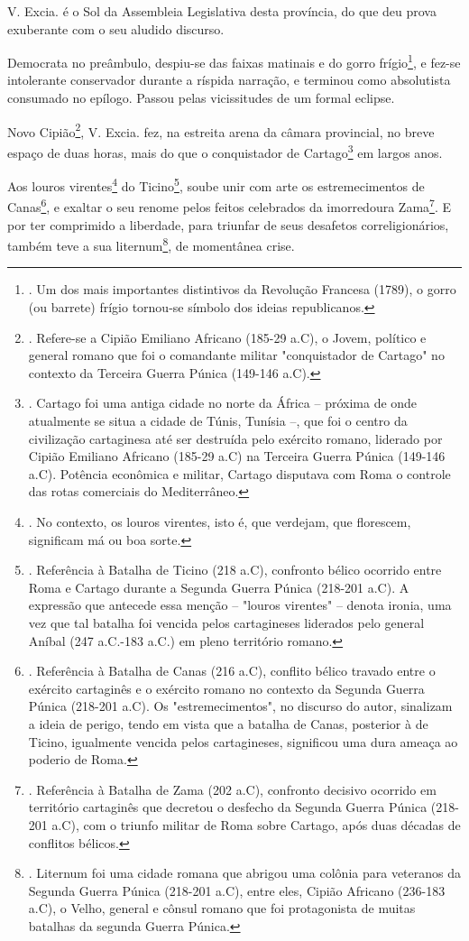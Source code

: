 V. Excia. é o Sol da Assembleia Legislativa desta província, do que deu
prova exuberante com o seu aludido discurso.

Democrata no preâmbulo, despiu-se das faixas matinais e do gorro
frígio\footnote{. Um dos mais importantes distintivos da Revolução
  Francesa (1789), o gorro (ou barrete) frígio tornou-se símbolo dos
  ideias republicanos.}, e fez-se intolerante conservador durante a
ríspida narração, e terminou como absolutista consumado no epílogo.
Passou pelas vicissitudes de um formal eclipse.

Novo Cipião\footnote{. Refere-se a Cipião Emiliano Africano (185-29
  a.C), o Jovem, político e general romano que foi o comandante militar
  "conquistador de Cartago" no contexto da Terceira Guerra Púnica
  (149-146 a.C).}, V. Excia. fez, na estreita arena da câmara
provincial, no breve espaço de duas horas, mais do que o conquistador de
Cartago\footnote{. Cartago foi uma antiga cidade no norte da África --
  próxima de onde atualmente se situa a cidade de Túnis, Tunísia --, que
  foi o centro da civilização cartaginesa até ser destruída pelo
  exército romano, liderado por Cipião Emiliano Africano (185-29 a.C) na
  Terceira Guerra Púnica (149-146 a.C). Potência econômica e militar,
  Cartago disputava com Roma o controle das rotas comerciais do
  Mediterrâneo.} em largos anos.

Aos louros virentes\footnote{. No contexto, os louros virentes, isto é,
  que verdejam, que florescem, significam má ou boa sorte.} do
Ticino\footnote{. Referência à Batalha de Ticino (218 a.C), confronto
  bélico ocorrido entre Roma e Cartago durante a Segunda Guerra Púnica
  (218-201 a.C). A expressão que antecede essa menção -- "louros
  virentes" -- denota ironia, uma vez que tal batalha foi vencida pelos
  cartagineses liderados pelo general Aníbal (247 a.C.-183 a.C.) em
  pleno território romano.}, soube unir com arte os estremecimentos de
Canas\footnote{. Referência à Batalha de Canas (216 a.C), conflito
  bélico travado entre o exército cartaginês e o exército romano no
  contexto da Segunda Guerra Púnica (218-201 a.C). Os "estremecimentos",
  no discurso do autor, sinalizam a ideia de perigo, tendo em vista que
  a batalha de Canas, posterior à de Ticino, igualmente vencida pelos
  cartagineses, significou uma dura ameaça ao poderio de Roma.}, e
exaltar o seu renome pelos feitos celebrados da imorredoura
Zama\footnote{. Referência à Batalha de Zama (202 a.C), confronto
  decisivo ocorrido em território cartaginês que decretou o desfecho da
  Segunda Guerra Púnica (218-201 a.C), com o triunfo militar de Roma
  sobre Cartago, após duas décadas de conflitos bélicos.}. E por ter
comprimido a liberdade, para triunfar de seus desafetos
correligionários, também teve a sua liternum\footnote{. Liternum foi uma
  cidade romana que abrigou uma colônia para veteranos da Segunda Guerra
  Púnica (218-201 a.C), entre eles, Cipião Africano (236-183 a.C), o
  Velho, general e cônsul romano que foi protagonista de muitas batalhas
  da segunda Guerra Púnica.}, de momentânea crise.

